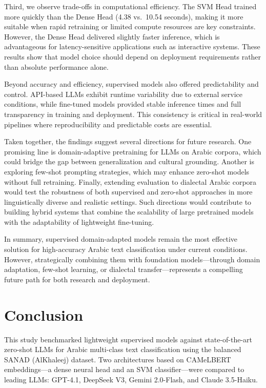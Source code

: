 \documentclass[sn-mathphys-num]{sn-jnl}
\begin{document}
Third, we observe trade-offs in computational efficiency. The SVM Head trained more quickly than the Dense Head (4.38 vs.\ 10.54 seconds), making it more suitable when rapid retraining or limited compute resources are key constraints. However, the Dense Head delivered slightly faster inference, which is advantageous for latency-sensitive applications such as interactive systems. These results show that model choice should depend on deployment requirements rather than absolute performance alone.

Beyond accuracy and efficiency, supervised models also offered predictability and control. API-based LLMs exhibit runtime variability due to external service conditions, while fine-tuned models provided stable inference times and full transparency in training and deployment. This consistency is critical in real-world pipelines where reproducibility and predictable costs are essential.

Taken together, the findings suggest several directions for future research. One promising line is domain-adaptive pretraining for LLMs on Arabic corpora, which could bridge the gap between generalization and cultural grounding. Another is exploring few-shot prompting strategies, which may enhance zero-shot models without full retraining. Finally, extending evaluation to dialectal Arabic corpora would test the robustness of both supervised and zero-shot approaches in more linguistically diverse and realistic settings. Such directions would contribute to building hybrid systems that combine the scalability of large pretrained models with the adaptability of lightweight fine-tuning.

In summary, supervised domain-adapted models remain the most effective solution for high-accuracy Arabic text classification under current conditions. However, strategically combining them with foundation models—through domain adaptation, few-shot learning, or dialectal transfer—represents a compelling future path for both research and deployment.

\section{Conclusion}
\label{conclusion}

This study benchmarked lightweight supervised models against state-of-the-art zero-shot LLMs for Arabic multi-class text classification using the balanced SANAD (AlKhaleej) dataset. Two architectures based on CAMeLBERT embeddings—a dense neural head and an SVM classifier—were compared to leading LLMs: GPT-4.1, DeepSeek V3, Gemini 2.0-Flash, and Claude 3.5-Haiku.
\end{document}
